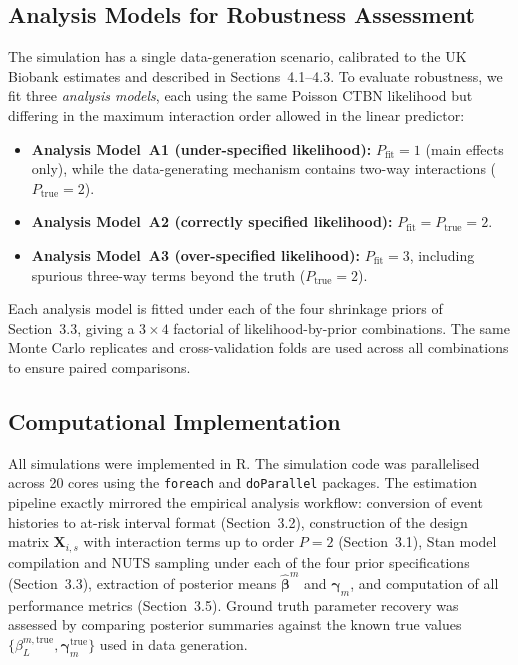 \documentclass[12pt]{article}
\begin{document}
\subsection{Analysis Models for Robustness Assessment}
\label{sec:analysis_models}

The simulation has a single data-generation scenario, calibrated to the UK Biobank estimates and described in Sections~4.1--4.3. To evaluate robustness, we fit three \emph{analysis models}, each using the same Poisson CTBN likelihood but differing in the maximum interaction order allowed in the linear predictor:
\begin{itemize}[leftmargin=*,nosep]
\item \textbf{Analysis Model~A1 (under-specified likelihood):} $P_{\mathrm{fit}} = 1$ (main effects only), while the data-generating mechanism contains two-way interactions ($P_{\mathrm{true}} = 2$).
\item \textbf{Analysis Model~A2 (correctly specified likelihood):} $P_{\mathrm{fit}} = P_{\mathrm{true}} = 2$.
\item \textbf{Analysis Model~A3 (over-specified likelihood):} $P_{\mathrm{fit}} = 3$, including spurious three-way terms beyond the truth ($P_{\mathrm{true}} = 2$).
\end{itemize}
Each analysis model is fitted under each of the four shrinkage priors of Section~3.3, giving a $3 \times 4$ factorial of likelihood-by-prior combinations. The same Monte Carlo replicates and cross-validation folds are used across all combinations to ensure paired comparisons.

\subsection{Computational Implementation}

All simulations were implemented in R. The simulation code was parallelised across 20 cores using the \texttt{foreach} and \texttt{doParallel} packages. The estimation pipeline exactly mirrored the empirical analysis workflow: conversion of event histories to at-risk interval format (Section~3.2), construction of the design matrix $\mathbf{X}_{i,s}$ with interaction terms up to order $P = 2$ (Section~3.1), Stan model compilation and NUTS sampling under each of the four prior specifications (Section~3.3), extraction of posterior means $\hat{\boldsymbol{\beta}}^m$ and $\hat{\boldsymbol{\gamma}}_m$, and computation of all performance metrics (Section~3.5). Ground truth parameter recovery was assessed by comparing posterior summaries against the known true values $\{\beta^{m,\mathrm{true}}_L, \boldsymbol{\gamma}^{\mathrm{true}}_m\}$ used in data generation.
\end{document}

